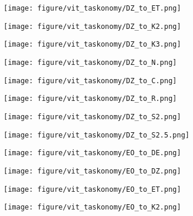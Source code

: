 \begin{figure}[h]
\begin{subfigure}{\figlength\textwidth}
\end{subfigure}
\begin{subfigure}{\figlength\textwidth}
\texttt{[image: figure/vit\_taskonomy/DZ\_to\_ET.png]}
\end{subfigure}
\begin{subfigure}{\figlength\textwidth}
\texttt{[image: figure/vit\_taskonomy/DZ\_to\_K2.png]}
\end{subfigure}
\begin{subfigure}{\figlength\textwidth}
\texttt{[image: figure/vit\_taskonomy/DZ\_to\_K3.png]}
\end{subfigure}
\begin{subfigure}{\figlength\textwidth}
\texttt{[image: figure/vit\_taskonomy/DZ\_to\_N.png]}
\end{subfigure}
\begin{subfigure}{\figlength\textwidth}
\texttt{[image: figure/vit\_taskonomy/DZ\_to\_C.png]}
\end{subfigure}
\begin{subfigure}{\figlength\textwidth}
\texttt{[image: figure/vit\_taskonomy/DZ\_to\_R.png]}
\end{subfigure}
\begin{subfigure}{\figlength\textwidth}
\texttt{[image: figure/vit\_taskonomy/DZ\_to\_S2.png]}
\end{subfigure}
\begin{subfigure}{\figlength\textwidth}
\texttt{[image: figure/vit\_taskonomy/DZ\_to\_S2.5.png]}
\end{subfigure}
\begin{subfigure}{\figlength\textwidth}
\texttt{[image: figure/vit\_taskonomy/EO\_to\_DE.png]}
\end{subfigure}
\begin{subfigure}{\figlength\textwidth}
\texttt{[image: figure/vit\_taskonomy/EO\_to\_DZ.png]}
\end{subfigure}
\begin{subfigure}{\figlength\textwidth}
\texttt{[image: figure/vit\_taskonomy/EO\_to\_ET.png]}
\end{subfigure}
\begin{subfigure}{\figlength\textwidth}
\texttt{[image: figure/vit\_taskonomy/EO\_to\_K2.png]}
\end{subfigure}
\begin{subfigure}{\figlength\textwidth}

\end{subfigure}
\end{figure}
